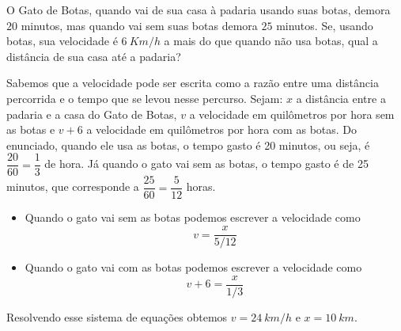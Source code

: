 \begin{problem}
O Gato de Botas, quando vai de sua casa à padaria usando suas botas, demora $20$ minutos, mas quando vai sem suas botas demora $25$ minutos. Se, usando botas, sua velocidade é $6\ Km/h$ a mais do que quando não usa botas, qual a distância de sua casa até a padaria?
\end{problem}
\begin{solution}
Sabemos que a velocidade pode ser escrita como a razão entre uma distância percorrida e o tempo que se levou nesse percurso. Sejam: $x$ a distância entre a padaria e a casa do Gato de Botas, $v$ a velocidade em quilômetros por hora sem as botas e $v+6$ a velocidade em quilômetros por hora com as botas. Do enunciado, quando ele usa as botas, o tempo gasto é 20 minutos, ou seja, é $\dfrac{20}{60}=\dfrac{1}{3}$ de hora. Já quando o gato vai sem as botas, o tempo gasto é de 25 minutos, que corresponde a $\dfrac{25}{60}=\dfrac{5}{12}$ horas.
\begin{itemize}
\item Quando o gato vai sem as botas podemos escrever a velocidade como 
$$v = \dfrac{x}{5/12}$$
\item Quando o gato vai com as botas podemos escrever a velocidade como
$$v+6 = \dfrac{x}{1/3}$$
\end{itemize}
Resolvendo esse sistema de equações obtemos $v=24\ km/h$ e $x=10\ km$.
\end{solution}

